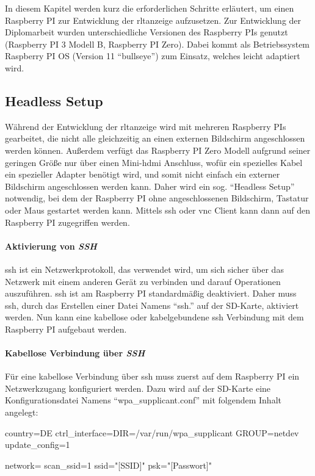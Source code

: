 \label{raspi_setup}
In diesem Kapitel werden kurz die erforderlichen Schritte erläutert, um einen Raspberry PI zur Entwicklung der \ac{rltanzeige} aufzusetzen.
Zur Entwicklung der Diplomarbeit wurden unterschiedliche Versionen des Raspberry PIs genutzt (Raspberry PI 3 Modell B, Raspberry PI Zero). Dabei kommt als Betriebssystem Raspberry PI OS (Version 11 \enquote{bullseye}) zum Einsatz, welches leicht adaptiert wird.

\subsection{Headless Setup}\label{raspi_headless_setup}
Während der Entwicklung der \ac{rltanzeige} wird mit mehreren Raspberry PIs gearbeitet, die nicht alle gleichzeitig an einen externen Bildschirm angeschlossen werden können. Außerdem verfügt das Raspberry PI Zero Modell aufgrund seiner geringen Größe nur über einen Mini-\ac{hdmi} Anschluss, wofür ein spezielles Kabel \bzw ein spezieller Adapter benötigt wird, und somit nicht einfach ein externer Bildschirm angeschlossen werden kann. Daher wird ein sog. \enquote{Headless Setup} notwendig, bei dem der Raspberry PI ohne angeschlossenen Bildschirm, Tastatur oder Maus gestartet werden kann. Mittels \ac{ssh} oder \ac{vnc} Client kann dann auf den Raspberry PI zugegriffen werden.
\cite[vgl.][]{Piltch:2022}

\paragraph{Aktivierung von \textit{SSH}}
\ac{ssh} ist ein Netzwerkprotokoll, das verwendet wird, um sich sicher über das Netzwerk mit einem anderen Gerät zu verbinden und darauf Operationen auszuführen. \ac{ssh} ist am Raspberry PI standardmäßig deaktiviert.  Daher muss \ac{ssh}, durch das Erstellen einer Datei Namens \enquote{ssh.} auf der SD-Karte, aktiviert werden. Nun kann eine kabellose oder kabelgebundene \ac{ssh} Verbindung mit dem Raspberry PI aufgebaut werden.

\paragraph{Kabellose Verbindung über \textit{SSH}}
Für eine kabellose Verbindung über \ac{ssh} muss zuerst auf dem Raspberry PI ein Netzwerkzugang konfiguriert werden. Dazu wird auf der SD-Karte eine Konfigurationsdatei Namens \enquote{wpa\_supplicant.conf} mit folgendem Inhalt angelegt:
\begin{textcode}
country=DE
ctrl_interface=DIR=/var/run/wpa_supplicant GROUP=netdev
update_config=1

network={
    scan_ssid=1
    ssid="[SSID]"
    psk="[Passwort]"
}
\end{textcode}

